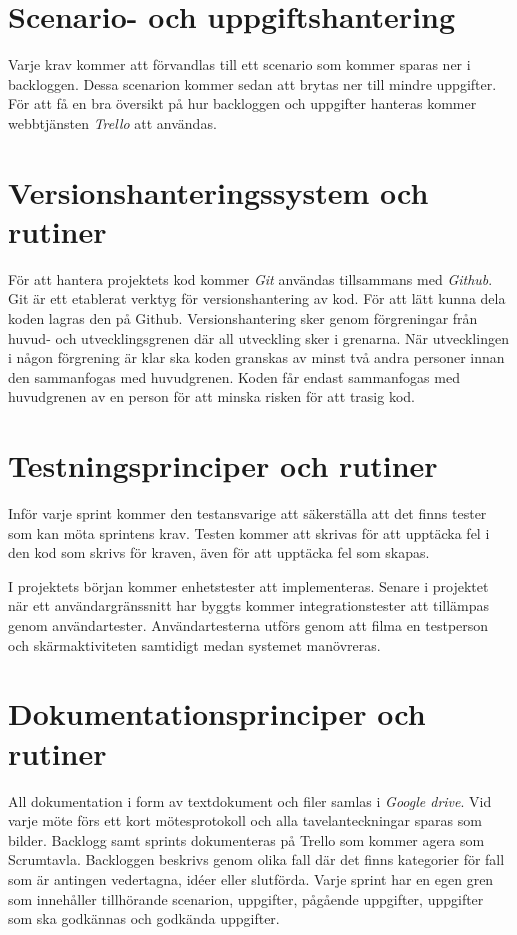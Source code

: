 \documentclass[a4paper,12pt,oneside,final]{extbook}
\begin{document}
\section{Scenario- och uppgiftshantering}
Varje krav kommer att förvandlas till ett scenario som kommer sparas
ner i backloggen. Dessa scenarion kommer sedan att brytas ner till
mindre uppgifter. För att få en bra översikt på hur
backloggen och uppgifter hanteras kommer webbtjänsten \emph{Trello} att användas.

\section{Versionshanteringssystem och rutiner}
För att hantera projektets kod kommer \emph{Git} användas tillsammans med
\emph{Github}. Git är ett etablerat verktyg för versionshantering av kod.
För att lätt kunna dela koden lagras den på Github. Versionshantering
sker genom förgreningar från huvud- och utvecklingsgrenen där all
utveckling sker i grenarna. När utvecklingen i någon förgrening är
klar ska koden granskas av minst två andra personer innan den
sammanfogas med huvudgrenen. Koden får endast sammanfogas med
huvudgrenen av en person för att minska risken för att trasig kod.

\section{Testningsprinciper och rutiner}
Inför varje sprint kommer den testansvarige att säkerställa att
det finns tester som kan möta sprintens krav. Testen kommer att
skrivas för att upptäcka fel i den kod som skrivs för kraven,
även för att upptäcka fel som skapas.

I projektets början kommer enhetstester att implementeras. Senare
i projektet när ett användargränssnitt har byggts kommer
integrationstester att tillämpas genom användartester. Användartesterna
utförs genom att filma en testperson och skärmaktiviteten samtidigt
medan systemet manövreras.

\section{Dokumentationsprinciper och rutiner}
All dokumentation i form av textdokument och filer samlas i \emph{Google
drive}. Vid varje möte förs ett kort mötesprotokoll och alla
tavelanteckningar sparas som bilder. Backlogg samt sprints dokumenteras
på Trello som kommer agera som Scrumtavla. Backloggen beskrivs genom
olika fall där det finns kategorier för fall som är antingen vedertagna,
idéer eller slutförda. Varje sprint har en egen gren som innehåller
tillhörande scenarion, uppgifter, pågående uppgifter, uppgifter
som ska godkännas och godkända uppgifter.
\end{document}
